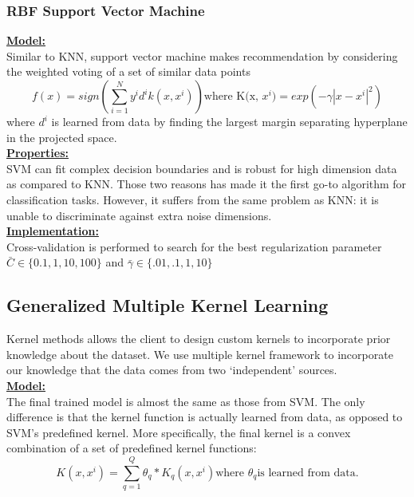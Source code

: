 \documentclass[8pts]{paper}
\begin{document}
\subsubsection*{RBF Support Vector Machine}
\underline{\textbf{Model:}}\\
Similar to KNN, support vector machine makes recommendation by considering the weighted voting of a set of similar data points\\
$$f(x) = sign(\sum_{i=1}^{N} y^i d^i k(x, x^i)) \text{where K(x, $x^i$)} = exp(-\gamma|x - x^i|^2)$$
where $d^i$ is learned from data by finding the largest margin separating hyperplane in the projected space.\\

\underline{\textbf{Properties:}}\\
SVM can fit complex decision boundaries and is robust for high dimension data as compared to KNN. Those two reasons has made it the first go-to algorithm for classification tasks. However, it suffers from the same problem as KNN: it is unable to discriminate against extra noise dimensions.\\

\underline{\textbf{Implementation:}}\\
Cross-validation is performed to search for the best regularization parameter $\bar{C} \in \{0.1, 1, 10, 100\}$ and $\bar{\gamma} \in \{.01, .1, 1, 10\}$\\

\subsection{Generalized Multiple Kernel Learning}
Kernel methods allows the client to design custom kernels to incorporate prior knowledge about the dataset. We use multiple kernel framework to incorporate our knowledge that the data comes from two `independent' sources.\\

\underline{\textbf{Model:}}\\
The final trained model is almost the same as those from SVM. The only difference is that the kernel function is actually learned from data, as opposed to SVM's predefined kernel. More specifically, the final kernel is a convex combination of a set of predefined kernel functions: $$K(x, x^i) = \sum_{q=1}^{Q} \theta_q * K_q(x, x^i) \text{where }\theta_q \text{is learned from data}.$$
\end{document}
